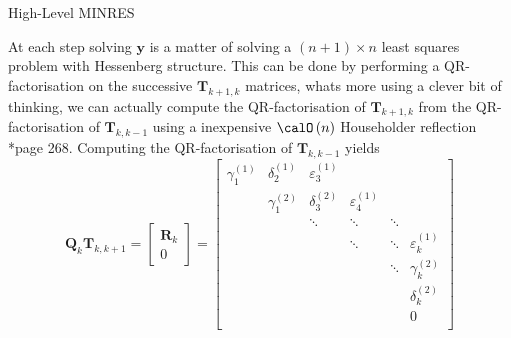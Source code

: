 {\centering
\begin{minipage}{.85\linewidth}
    \begin{algorithm}[H]
        \caption{High-Level MINRES}
        \label{alg: highlev_minres}
        \SetAlgoLined
        \DontPrintSemicolon

        \BlankLine
        \BlankLine
    \end{algorithm}
\end{minipage}
\par
}
At each step solving $\bm{y}$ is a matter of solving a $(n+1) \times n$ least squares problem with Hessenberg structure. This can be done by performing a QR-factorisation on the successive $\bm{T}_{k+1,k}$ matrices, whats more using a clever bit of thinking, we can actually compute the QR-factorisation of $\bm{T}_{k+1,k}$ from the QR-factorisation of $\bm{T}_{k,k-1}$ using a inexpensive $\calO \left( n \right)$ Householder reflection \cite{TrefethenLloydN.LloydNicholas1997Nla/}*{page 268}. Computing the QR-factorisation of $\bm{T}_{k,k-1}$ yields
\begin{equation}
    \bm{Q}_k \bm{T}_{k,k+1}
    =
    \begin{bmatrix}
        \bm{R}_k \\ 0
    \end{bmatrix}
    =
    \begin{bmatrix}
        \gamma_{1}^{(1)} & \delta_{2}^{(1)} & \varepsilon_{3}^{(1)} &                       &        &                       \\
                         & \gamma_{1}^{(2)} & \delta_{3}^{(2)}      & \varepsilon_{4}^{(1)} &        &                       \\
                         &                  & \ddots                & \ddots                & \ddots &                       \\
                         &                  &                       & \ddots                & \ddots & \varepsilon_{k}^{(1)} \\
                         &                  &                       &                       & \ddots & \gamma_{k}^{(2)}      \\
                         &                  &                       &                       &        & \delta_{k}^{(2)}      \\
                         &                  &                       &                       &        & 0                     \\
    \end{bmatrix}
\end{equation}
